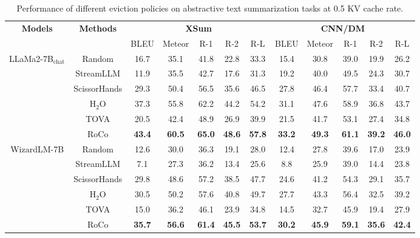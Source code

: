 \begin{table}[t]
    \centering
    \small
    \begin{tabular}{cc|ccccc|ccccc}
    \toprule
    \multicolumn{1}{c}{\multirow{2}{*}{\textbf{Models}}} & \multirow{2}{*}{\textbf{Methods}} & \multicolumn{5}{c}{\textbf{XSum}}         & \multicolumn{5}{c}{\textbf{CNN/DM}}       \\
    \multicolumn{1}{c}{} &              & BLEU & Meteor & R-1  & R-2  & R-L  & BLEU & Meteor & R-1  & R-2  & R-L  \\
    \midrule
    \multirow{6}{*}{LLaMa2-7B$_{\text{chat}}$}             & Random                   & 16.7 & 35.1 & 41.8 & 22.8 & 33.3 & 15.4 & 30.8 & 39.0 & 19.9 & 26.2 \\
                         & StreamLLM   & 11.9 & 35.5   & 42.7 & 17.6 & 31.3 & 19.2 & 40.0   & 49.5 & 24.3 & 30.7 \\
                         & ScissorHands & 29.3 & 50.4   & 56.5 & 35.6 & 46.5 & 27.8 & 46.4   & 57.7 & 33.4 & 40.7 \\
                         & H$_{\text{2}}$O          & 37.3 & 55.8   & 62.2 & 44.2 & 54.2 & 31.1 & 47.6   & 58.9 & 36.8 & 43.7 \\
                         & TOVA         & 20.5 & 42.4   & 48.9 & 26.9 & 39.9 & 21.5 & 41.7   & 53.1 & 27.4 & 34.8 \\
                         & RoCo         & \textbf{43.4} & \textbf{60.5}   & \textbf{65.0} & \textbf{48.6} & \textbf{57.8} & \textbf{33.2} & \textbf{49.3}   & \textbf{61.1} & \textbf{39.2} & \textbf{46.0} \\
    \midrule
    \multirow{6}{*}{WizardLM-7B}             & Random                   &12.6  &30.0  &36.3  &19.1  &28.0  &12.4  &27.8  &39.6  &17.0  &23.9  \\
                         & StreamLLM   &7.1  &27.3    &36.2  &13.4  &25.6  &8.8  &25.9    &39.0  &14.4  &23.8  \\
                         & ScissorHands &29.8  &48.6    &57.2  &38.5  &47.7  &24.6  &41.2    &54.3  &29.1  &35.7  \\
                         & H$_{\text{2}}$O          &30.5  &50.2    &57.6  &40.8  &49.7  &27.7  &43.3    &56.4  &32.5  &39.2  \\
                         & TOVA         &15.0  &36.2    &46.1  &23.9  &34.8  &14.5  &32.7    &45.9  &19.4  &27.9  \\
                         & RoCo         &\textbf{35.7}  &\textbf{56.6}    &\textbf{61.4}  &\textbf{45.5}  &\textbf{53.7}  &\textbf{30.2}  &\textbf{45.9}    &\textbf{59.1}  &\textbf{35.6}  &\textbf{42.4}  \\
    \bottomrule
    \end{tabular}
    \caption{Performance of different eviction policies on abstractive text summarization tasks at 0.5 KV cache rate.}
    \label{table:sum}
\end{table}
